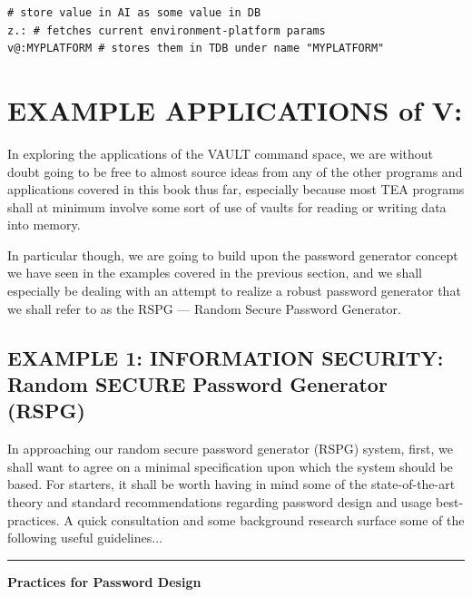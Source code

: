 \documentclass[a4paper, 18pt]{book} %
\begin{document}
{{{\begin{tcolorbox}[teaterminalstyle, title=V: EXAMPLE 4: Basic TEA Database Operations, breakable]
\begin{lstlisting}[language=TEA,breaklines=true,]
# store value in AI as some value in DB
z.: # fetches current environment-platform params
v@:MYPLATFORM # stores them in TDB under name "MYPLATFORM"
   \end{lstlisting}
  \end{tcolorbox}

\vspace{2em}


 
\section{EXAMPLE APPLICATIONS of V:}
\label{SECEXAMPV}

  
In exploring the applications of the VAULT command space, we are without doubt going to be free to almost source ideas from any of the other programs and applications covered in this book thus far, especially because most TEA programs shall at minimum involve some sort of use of vaults for reading or writing data into memory.

\vspace{2em}

In particular though, we are going to build upon the password generator concept we have seen in the examples covered in the previous section, and we shall especially be dealing with an attempt to realize a robust password generator that we shall refer to as the RSPG --- Random Secure Password Generator.



\subsection{EXAMPLE 1: \textbf{INFORMATION SECURITY:} Random SECURE Password Generator (RSPG)}
\label{SECEXAMP1V}


In approaching our random secure password generator (RSPG) system, first, we shall want to agree on a minimal specification upon which the system should be based. For starters, it shall be worth having in mind some of the state-of-the-art theory and standard recommendations regarding password design and usage best-practices. A quick consultation\cite{copilot_assistant} and some background research surface some of the following useful guidelines...

\vspace{2em}


\noindent\rule{\textwidth}{0.4pt}


\textbf{Practices for Password Design}

}}}
\end{document}
